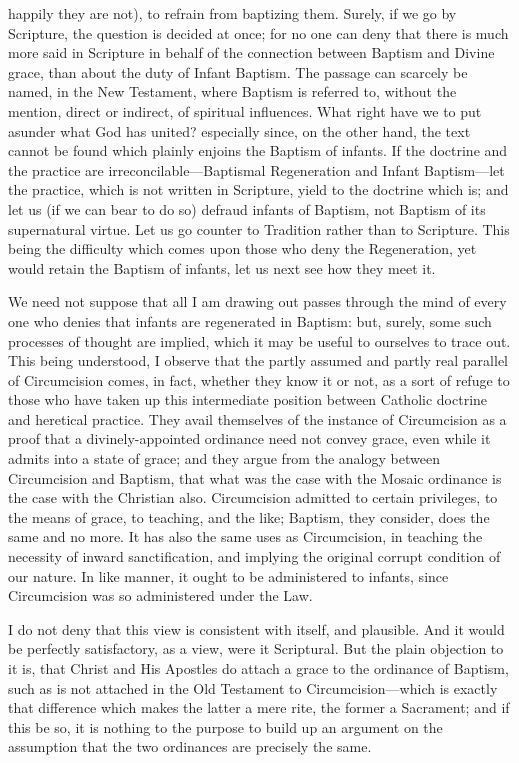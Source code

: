happily they are not), to refrain from baptizing them. Surely, if we
go by Scripture, the question is decided at once; for no one can deny
that there is much more said in Scripture in behalf of the connection
between Baptism and Divine grace, than about the duty of Infant
Baptism. The passage can scarcely be named, in the New Testament,
where Baptism is referred to, without the mention, direct or indirect,
of spiritual influences. What right have we to put asunder what God
has united? especially since, on the other hand, the text cannot be
found which plainly enjoins the Baptism of infants. If the doctrine
and the practice are irreconcilable—Baptismal Regeneration and
Infant Baptism—let the practice, which is not written in Scripture,
yield to the doctrine which is; and let us (if we can bear to do so)
defraud infants of Baptism, not Baptism of its supernatural virtue.
Let us go counter to Tradition rather than to Scripture. This being
the difficulty which comes upon those who deny the Regeneration, yet
would retain the Baptism of infants, let us next see how they meet it.

We need not suppose that all I am drawing out passes through the
mind of every one who denies that infants are regenerated in Baptism:
but, surely, some such processes of thought are implied, which it may
be useful to ourselves to trace out. This being understood, I observe
that the partly assumed and partly real parallel of Circumcision
comes, in fact, whether they know it or not, as a sort of refuge to
those who have taken up this intermediate position between Catholic
doctrine and heretical practice. They avail themselves of the instance
of Circumcision as a proof that a divinely-appointed ordinance need
not convey grace, even while it admits into a state of grace; and they
argue from the analogy between Circumcision and Baptism, that what was
the case with the Mosaic ordinance is the case with the Christian
also. Circumcision admitted to certain privileges, to the means of
grace, to teaching, and the like; Baptism, they consider, does the
same and no more. It has also the same uses as Circumcision, in
teaching the necessity of inward sanctification, and implying the
original corrupt condition of our nature. In like manner, it ought to
be administered to infants, since Circumcision was so administered
under the Law.

I do not deny that this view is consistent with itself, and
plausible. And it would be perfectly satisfactory, as a view, were it
Scriptural. But the plain objection to it is, that Christ and His
Apostles do attach a grace to the ordinance of Baptism, such as is not
attached in the Old Testament to Circumcision—which is exactly that
difference which makes the latter a mere rite, the former a Sacrament;
and if this be so, it is nothing to the purpose to build up an
argument on the assumption that the two ordinances are precisely the
same.

